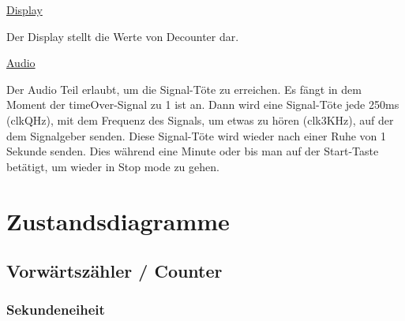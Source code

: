 \documentclass[a4paper, 11pt]{article}
\begin{document}
\begin{flushleft}
	     \underline{\large Display}
     
	     \vspace{0.1cm}
     
	     {\small Der Display stellt die Werte von Decounter dar. }
     
	     \vspace{1cm}
     
	     \underline{\large Audio}
     
	     \vspace{0.1cm}
     
		 {\small Der Audio Teil erlaubt, um die Signal-Töte zu erreichen.
		 \newline
		 Es fängt in dem Moment der timeOver-Signal zu 1 ist an. Dann wird eine Signal-Töte jede 250ms (clkQHz), mit dem Frequenz des Signals, um etwas zu hören (clk3KHz), auf der dem Signalgeber senden. Diese Signal-Töte wird wieder nach einer Ruhe von 1 Sekunde senden. Dies während eine Minute oder bis man auf der Start-Taste betätigt, um wieder in Stop mode zu gehen. 
		 }
     
    \end{flushleft} %
  

	\newpage


	\section{Zustandsdiagramme}
	
		\subsection{Vorwärtszähler / Counter}
			\subsubsection{Sekundeneiheit}
	
\end{document}
